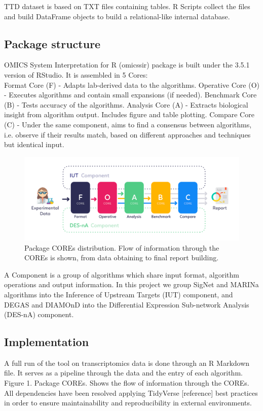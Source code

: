 TTD dataset is based on TXT files containing tables. R Scripts collect the files and build DataFrame objects to build a relational-like internal database.
\\

\subsection{Package structure}
OMICS System Interpretation for R (omicssir) package is built under the 3.5.1 version of RStudio. It is assembled in 5 Cores:
\\

Format Core (F) - Adapts lab-derived data to the algorithms.
Operative Core (O) - Executes algorithms and contain small expansions (if needed).
Benchmark Core (B) - Tests accuracy of the algorithms.
Analysis Core (A) - Extracts biological insight from algorithm output. Includes figure and table plotting.
Compare Core (C) - Under the same component, aims to find a consensus between algorithms, i.e. observe if their results match, based on different approaches and techniques but identical input.
\\

\begin{figure}[!h]
    \centering
    \includegraphics[width=\linewidth]{Major Thesis/figures/art/workflow.png}
    \caption{Package COREs distribution. Flow of information through the COREs is shown, from data obtaining to final report building.}
    \label{fig:workflow}
\end{figure}

A Component is a group of algorithms which share input format, algorithm operations and output information. In this project we group SigNet and MARINa algorithms into the Inference of Upstream Targets (IUT) component, and DEGAS and DIAMOnD into the Differential Expression Sub-network Analysis (DES-nA) component.

\subsection{Implementation}
A full run of the tool on transcriptomics data is done through an R Markdown file. It serves as a pipeline through the data and the entry of each algorithm.
Figure 1. Package COREs. Shows the flow of information through the COREs.
All dependencies have been resolved applying TidyVerse [reference] best practices in order to ensure maintainability and reproducibility in external environments.


